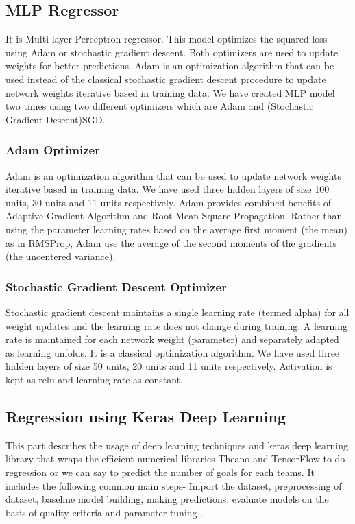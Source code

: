 \subsection{MLP Regressor}
It is Multi-layer Perceptron regressor. This model optimizes the squared-loss using Adam or stochastic gradient descent. Both optimizers are used to update weights for better predictions. Adam is an optimization algorithm that can be used instead of the classical stochastic gradient descent procedure to update network weights iterative based in training data. We have created MLP model two times using two different optimizers which are Adam and (Stochastic Gradient Descent)SGD.\newline
\subsubsection{Adam Optimizer }
Adam is an optimization algorithm that can be used to update network weights iterative based in training data. We have used three hidden layers of size 100 units, 30 units and 11 units respectively. Adam provides combined benefits of Adaptive Gradient Algorithm and Root Mean Square Propagation. Rather than using the parameter learning rates based on the average first moment (the mean) as in RMSProp, Adam use the average of the second moments of the gradients (the uncentered variance).\newline
\subsubsection{Stochastic Gradient Descent Optimizer }
Stochastic gradient descent maintains a single learning rate (termed alpha) for all weight updates and the learning rate does not change during training. A learning rate is maintained for each network weight (parameter) and separately adapted as learning unfolds. It is a classical optimization algorithm. We have used three hidden layers of size 50 units, 20 units and 11 units respectively. Activation is kept as relu and learning rate as constant.\newline
\subsection{Regression using Keras Deep Learning }
This part describes the usage of deep learning techniques and keras deep learning library that wraps the efficient numerical libraries Theano and TensorFlow to do regression or we can say to predict the number of goals for each teams. It includes the following common main steps- Import the dataset, preprocessing of dataset, baseline model building, making predictions, evaluate models on the basis of quality criteria and parameter tuning 
\cite{tensorflow:tutorial} \cite{tensorflow:keras}.\newline
